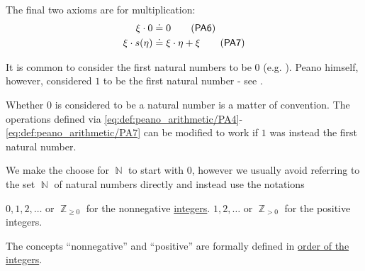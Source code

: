 \begin{definition}
\begin{thmenum}[resume=def:peano_arithmetic]
     The final two axioms are for multiplication:
    \begin{align}
      \xi \cdot 0       &\doteq 0                    \label{eq:def:peano_arithmetic/PA6}\tag{\logic{PA6}} \\
      \xi \cdot s(\eta) &\doteq \xi \cdot \eta + \xi \label{eq:def:peano_arithmetic/PA7}\tag{\logic{PA7}}
    \end{align}
  \end{thmenum}
\end{definition}

\begin{remark}\label{rem:peano_arithmetic_zero}
  It is common to consider the first natural numbers to be \( 0 \) (e.g. \cite[exmpl. 17.6]{OpenLogicFull}). Peano himself, however, considered \( 1 \) to be the first natural number - see \cite[1]{Peano1889}.

  Whether \( 0 \) is considered to be a natural number is a matter of convention. The operations defined via \eqref{eq:def:peano_arithmetic/PA4}-\eqref{eq:def:peano_arithmetic/PA7} can be modified to work if \( 1 \) was instead the first natural number.

  We make the choose for \( \BbbN \) to start with \( 0 \), however we usually avoid referring to the set \( \BbbN \) of natural numbers directly and instead use the notations
  \begin{thmenum}
     \( 0, 1, 2, \ldots \) or \( \BbbZ_{\geq 0} \) for the nonnegative \hyperref[def:integers]{integers}.
     \( 1, 2, \ldots \) or \( \BbbZ_{> 0} \) for the positive integers.
  \end{thmenum}

  The concepts \enquote{nonnegative} and \enquote{positive} are formally defined in \hyperref[def:integers/order]{order of the integers}.
\end{remark}

